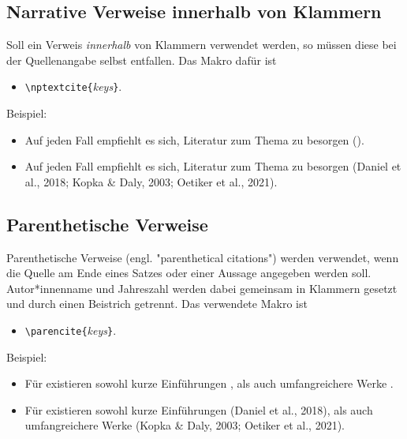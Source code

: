 \subsection{Narrative Verweise innerhalb von Klammern}

Soll ein Verweis \emph{innerhalb} von Klammern verwendet werden, so müssen
diese bei der Quellenangabe selbst entfallen. Das Makro dafür ist
%
\begin{itemize}
    \item[] \verb!\nptextcite{!\textit{keys}\verb!}!.
\end{itemize}
%
Beispiel:
%
\begin{itemize}
\item[]
\begin{LaTeXCode}[numbers=none,breakindent=0pt]
Auf jeden Fall empfiehlt es sich, Literatur zum Thema \latex zu besorgen
(\zB {}).
\end{LaTeXCode}
\item[]
    Auf jeden Fall empfiehlt es sich, Literatur zum Thema \latex zu besorgen
    (\zB Daniel et al., 2018; Kopka \& Daly, 2003; Oetiker et al., 2021).
\end{itemize}

\subsection{Parenthetische Verweise}

Parenthetische Verweise (engl. "parenthetical citations") werden verwendet,
wenn die Quelle am Ende eines Satzes oder einer Aussage angegeben werden soll.
Autor*innen\-name und Jahreszahl werden dabei gemeinsam in Klammern gesetzt
und durch einen Beistrich getrennt. Das verwendete Makro ist
%
\begin{itemize}
    \item[] \verb!\parencite{!\textit{keys}\verb!}!.
\end{itemize}
%
Beispiel:
%
\begin{itemize}
\item[]
\begin{LaTeXCode}[numbers=none,breakindent=0pt]
Für \latex existieren sowohl kurze Einführungen \parencite{Daniel2018}, als
auch umfangreichere Werke \parencite{Oetiker2021, Kopka2003}.
\end{LaTeXCode}
%
\item[]
    Für \latex existieren sowohl kurze Einführungen (Daniel et al., 2018),
    als auch umfangreichere Werke (Kopka \& Daly, 2003; Oetiker et al., 2021).
\end{itemize}


